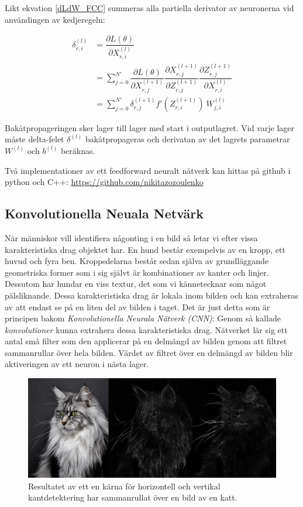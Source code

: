 \documentclass[a4paper,11pt,twoside]{article}
\newcommand*{\pd}[2]{\ensuremath{\dfrac{\partial #1}{\partial #2}}}
\begin{document}
Likt ekvation \eqref{dLdW_FCC} summeras alla  partiella derivator av neuronerna vid användingen av kedjeregeln:

\begin{equation}
\begin{split}
\delta^{(l)}_{r,i}
	& = \pd{L(\theta)}{X^{(l)}_{r,i}}  \\
	& = \sum^{N'}_{j=0} \pd{L(\theta)}{X^{(l+1)}_{r,j}} \pd{X^{(l+1)}_{r,j}}{Z^{(l+1)}_{r,j}} \pd{Z^{(l+1)}_{r,j}}{X^{(l)}_{r,i}} \\
	& = \sum^{N'}_{j=0} \delta^{(l+1)}_{r,j} f'(Z^{(l+1)}_{r,i}) \ W^{(l)}_{j,i} 
\end{split}
\end{equation}

Bakåtpropageringen sker lager till lager med start i outputlagret. Vid varje lager måste delta-felet $\delta^{(l)}$ bakåtpropageras och derivatan av det lagrets parametrar $W^{(l)}$ och $b^{(l)}$ beräknas.

Två implementationer av ett feedforward neuralt nätverk kan hittas på github i python och C++: \url{https://github.com/nikitazozoulenko}

\subsection{Konvolutionella Neuala Netvärk}
När människor vill identifiera någonting i en bild så letar vi efter vissa karakteristiska drag objektet har. En hund består exempelvis av en kropp, ett huvud och fyra ben. Kroppsdelarna består sedan själva av grundläggande geometriska former som i sig självt är kombinationer av kanter och linjer. Dessutom har hundar en viss textur, det som vi kännetecknar som något pälsliknande. Dessa karakteristiska drag är lokala inom bilden och kan extraheras av att endast se på en liten del av bilden i taget. Det är just detta som är principen bakom \textit{Konvolutionella Neurala Nätverk (CNN)}: Genom så kallade \textit{konvolutioner} kunna extrahera dessa karakteristiska drag. Nätverket lär sig ett antal små filter som den applicerar på en delmängd av bilden genom att filtret sammanrullar över hela bilden. Värdet av filtret över en delmängd av bilden blir aktiveringen av ett neuron i nästa lager.  \cite{cs231n}

\begin{figure}[h]\label{figkatter}
	\centering
  		\includegraphics[scale=0.33]{katter.png}
  	\caption{Resultatet av ett en kärna för horizontell och vertikal kantdetektering har sammanrullat över en bild av en katt.}
\end{figure}
\end{document}
